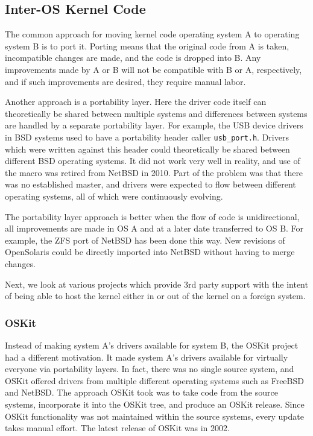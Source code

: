 \subsection{Inter-OS Kernel Code}

The common approach for moving kernel code operating system A to
operating system B is to port it.  Porting means that the original
code from A is taken, incompatible changes are made, and the code
is dropped into B.  Any improvements made by A or B will not be
compatible with B or A, respectively, and if such improvements are
desired, they require manual labor.

Another approach is a portability layer.  Here the driver
code itself can theoretically be shared between multiple systems
and differences between systems are handled by a separate portability
layer.  For example, the USB device drivers in BSD systems used to
have a portability header caller \verb+usb_port.h+.  Drivers which
were written against this header could theoretically be shared
between different BSD operating systems.  It did not work very well
in reality, and use of the macro was retired from NetBSD in 2010.
Part of the problem was that there was no established master, and
drivers were expected to flow between different operating systems,
all of which were continuously evolving.

The portability layer approach is better when the flow of code is
unidirectional, \ie all improvements are made in OS A and at a
later date transferred to OS B.  For example, the ZFS port of NetBSD
has been done this way.  New revisions of OpenSolaris could be
directly imported into NetBSD without having to merge changes.

Next, we look at various projects which provide 3rd party support
with the intent of being able to host the kernel either in or out of
the kernel on a foreign system.

\subsubsection*{OSKit}

Instead of making system A's drivers available for system B, the OSKit
project~\cite{ford:oskit} had a different motivation.
It made system A's drivers available for virtually everyone
via portability layers.  In fact, there was no single source system,
and OSKit offered drivers from multiple different operating systems
such as FreeBSD and NetBSD.  The approach OSKit took was to take
code from the source systems, incorporate it into the OSKit tree,
and produce an OSKit release.  Since OSKit functionality was not
maintained within the source systems, every update takes manual
effort.  The latest release of OSKit was in 2002.

